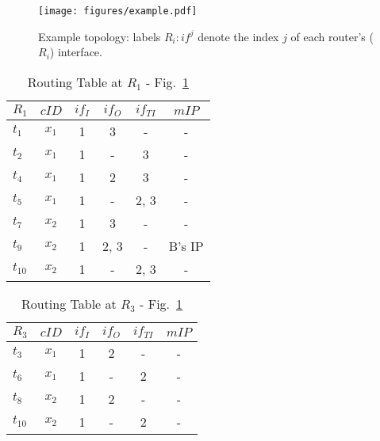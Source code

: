 \documentclass{sig-alternate}
\begin{document}
\begin{figure} [!t]
\begin{center}
	\texttt{[image: figures/example.pdf]}\vspace{-0.3cm}
	\caption{Example topology: labels $R_{i}:if^{j}$ denote the index $j$ of each router's ($R_{i}$) interface.}
	\label{example}    
\end{center}
\end{figure}

\begin{table}[!t]
\begin{center}

\begin{tabular}{l |*{5}{c}}
$R_1$              & $cID$ & $if_I$ & $if_O$ & $if_{TI}$ & $mIP$ \\
\hline
$t_1$	 & $x_1$ & 1 & 3 & - & -  \\
$t_2$          & $x_1$ & 1 & - & 3 & -   \\
$t_4$     	  & $x_1$ & 1 & 2 & 3 & -  \\
$t_5$     	  & $x_1$ & 1 & - & 2, 3 & -  \\
\hline
\hline
$t_7$     	  & $x_2$ & 1 & 3 & - & -  \\
$t_9$     	  & $x_2$ & 1 & 2, 3 & - & B's IP  \\
$t_{10}$     & $x_2$ & 1 & - & 2, 3 & -  \\
\end{tabular}
\caption{Routing Table at $R_1$ - Fig.~\ref{example}}
\label{table:r1routing-table}
\end{center}
\end{table}

\begin{table}[!t]
\begin{center}

\begin{tabular}{l |*{5}{c}}
$R_3$              & $cID$ & $if_I$ & $if_O$ & $if_{TI}$ & $mIP$ \\
\hline
$t_3$	 & $x_1$ & 1 & 2 & - & -  \\
$t_6$          & $x_1$ & 1 & - & 2 & -  \\
\hline
\hline
$t_8$          & $x_2$ & 1 & 2 & - & -  \\
$t_{10}$     & $x_2$ & 1 & - & 2 & -  \\
\end{tabular}
\caption{Routing Table at $R_3$ - Fig.~\ref{example}}
\label{table:r2routing-table}
\end{center}
\end{table}
\end{document}
